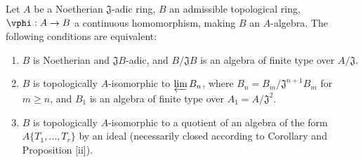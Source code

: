 \begin{proposition}[7.5.5]
\label{0.7.5.5}
Let $A$ be a Noetherian $\mathfrak{J}$-adic ring, $B$ an admissible topological ring,
$\vphi:A\to B$ a continuous homomorphism, making $B$ an $A$-algebra. The following
conditions are equivalent:
\begin{enumerate}
  \item[{\rm(a)}] $B$ is Noetherian and $\mathfrak{J}B$-adic, and $B/\mathfrak{J}B$ is an
    algebra of finite type over $A/\mathfrak{J}$.
  \item[{\rm(b)}] $B$ is topologically $A$-isomorphic to $\varprojlim B_n$, where
    $B_n=B_m/\mathfrak{J}^{n+1}B_m$ for $m\geq n$, and $B_1$ is an algebra of finite
    type over $A_1=A/\mathfrak{J}^2$.
  \item[{\rm(c)}] $B$ is topologically $A$-isomorphic to a quotient of an algebra of the form
    $A\{T_1,\dots,T_r\}$ by an ideal (necessarily closed according to
    Corollary  and Proposition [ii]).
\end{enumerate}
\end{proposition}

